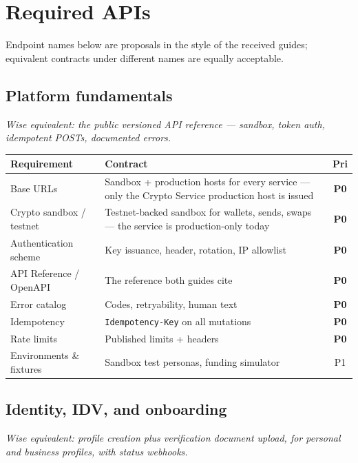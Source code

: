 \documentclass[11pt]{article}
\newcommand{\ep}[1]{\texttt{\small #1}}
\newcommand{\pri}[1]{\textbf{#1}}
\begin{document}
\section{Required APIs}\label{sec:req}

Endpoint names below are proposals in the style of the received guides; equivalent contracts under different names are equally acceptable.

\subsection{Platform fundamentals}\label{sec:fund}

\emph{Wise equivalent: the public versioned API reference --- sandbox, token auth, idempotent POSTs, documented errors.}

\begin{table}[H]
\centering
\small
\begin{tabular}{@{}p{5.4cm}p{7.2cm}c@{}}
\toprule
\textbf{Requirement} & \textbf{Contract} & \textbf{Pri} \\
\midrule
Base URLs & Sandbox + production hosts for every service --- only the Crypto Service production host is issued & \pri{P0} \\
Crypto sandbox / testnet & Testnet-backed sandbox for wallets, sends, swaps --- the service is production-only today & \pri{P0} \\
Authentication scheme & Key issuance, header, rotation, IP allowlist & \pri{P0} \\
API Reference / OpenAPI & The reference both guides cite & \pri{P0} \\
Error catalog & Codes, retryability, human text & \pri{P0} \\
Idempotency & \ep{Idempotency-Key} on all mutations & \pri{P0} \\
Rate limits & Published limits + headers & \pri{P0} \\
Environments \& fixtures & Sandbox test personas, funding simulator & P1 \\
\bottomrule
\end{tabular}
\end{table}

\subsection{Identity, IDV, and onboarding}\label{sec:idv}

\emph{Wise equivalent: profile creation plus verification document upload, for personal and business profiles, with status webhooks.}
\end{document}
